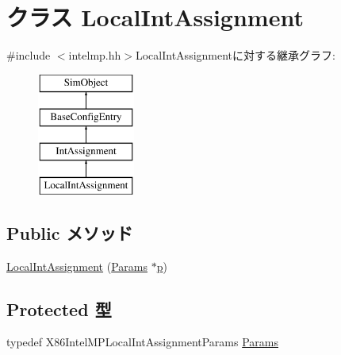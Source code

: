 \hypertarget{classX86ISA_1_1IntelMP_1_1LocalIntAssignment}{
\section{クラス LocalIntAssignment}
\label{classX86ISA_1_1IntelMP_1_1LocalIntAssignment}
}


{\ttfamily \#include $<$intelmp.hh$>$}LocalIntAssignmentに対する継承グラフ:\begin{figure}[H]
\begin{center}
\leavevmode
\includegraphics[height=4cm]{classX86ISA_1_1IntelMP_1_1LocalIntAssignment}
\end{center}
\end{figure}
\subsection*{Public メソッド}
\begin{DoxyCompactItemize}
\item 
\hyperlink{classX86ISA_1_1IntelMP_1_1LocalIntAssignment_ac4ae67c3066d56b8651343de4db4bcf0}{LocalIntAssignment} (\hyperlink{classX86ISA_1_1IntelMP_1_1LocalIntAssignment_a90695805b2535036d63fbf5101dc4849}{Params} $\ast$\hyperlink{namespaceX86ISA_af675c1d542a25b96e11164b80809a856}{p})
\end{DoxyCompactItemize}
\subsection*{Protected 型}
\begin{DoxyCompactItemize}
\item 
typedef X86IntelMPLocalIntAssignmentParams \hyperlink{classX86ISA_1_1IntelMP_1_1LocalIntAssignment_a90695805b2535036d63fbf5101dc4849}{Params}
\end{DoxyCompactItemize}


